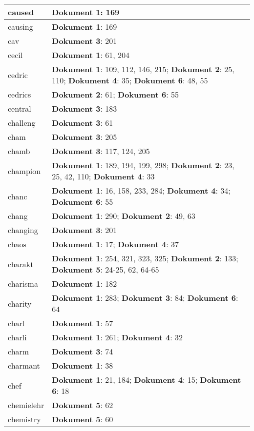 \documentclass[a5paper]{article}
\begin{document}
\begin{longtable}[l]{|l|p{3in}|}
\hline
caused & \textbf{Dokument 1}: 169 \\
\hline
causing & \textbf{Dokument 1}: 169 \\
\hline
cav & \textbf{Dokument 3}: 201 \\
\hline
cecil & \textbf{Dokument 1}: 61, 204 \\
\hline
cedric & \textbf{Dokument 1}: 109, 112, 146, 215; \textbf{Dokument 2}: 25, 110; \textbf{Dokument 4}: 35; \textbf{Dokument 6}: 48, 55 \\
\hline
cedrics & \textbf{Dokument 2}: 61; \textbf{Dokument 6}: 55 \\
\hline
central & \textbf{Dokument 3}: 183 \\
\hline
challeng & \textbf{Dokument 3}: 61 \\
\hline
cham & \textbf{Dokument 3}: 205 \\
\hline
chamb & \textbf{Dokument 3}: 117, 124, 205 \\
\hline
champion & \textbf{Dokument 1}: 189, 194, 199, 298; \textbf{Dokument 2}: 23, 25, 42, 110; \textbf{Dokument 4}: 33 \\
\hline
chanc & \textbf{Dokument 1}: 16, 158, 233, 284; \textbf{Dokument 4}: 34; \textbf{Dokument 6}: 55 \\
\hline
chang & \textbf{Dokument 1}: 290; \textbf{Dokument 2}: 49, 63 \\
\hline
changing & \textbf{Dokument 3}: 201 \\
\hline
chaos & \textbf{Dokument 1}: 17; \textbf{Dokument 4}: 37 \\
\hline
charakt & \textbf{Dokument 1}: 254, 321, 323, 325; \textbf{Dokument 2}: 133; \textbf{Dokument 5}: 24-25, 62, 64-65 \\
\hline
charisma & \textbf{Dokument 1}: 182 \\
\hline
charity & \textbf{Dokument 1}: 283; \textbf{Dokument 3}: 84; \textbf{Dokument 6}: 64 \\
\hline
charl & \textbf{Dokument 1}: 57 \\
\hline
charli & \textbf{Dokument 1}: 261; \textbf{Dokument 4}: 32 \\
\hline
charm & \textbf{Dokument 3}: 74 \\
\hline
charmant & \textbf{Dokument 1}: 38 \\
\hline
chef & \textbf{Dokument 1}: 21, 184; \textbf{Dokument 4}: 15; \textbf{Dokument 6}: 18 \\
\hline
chemielehr & \textbf{Dokument 5}: 62 \\
\hline
chemistry & \textbf{Dokument 5}: 60 \\

\end{longtable}
\end{document}
